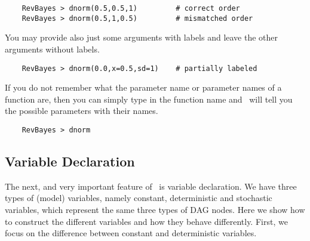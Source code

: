 {\tt \begin{snugshade*}
\begin{lstlisting}    
    RevBayes > dnorm(0.5,0.5,1)         # correct order
    RevBayes > dnorm(0.5,1,0.5)         # mismatched order
\end{lstlisting}
\end{snugshade*}}
You may provide also just some arguments with labels and leave the other arguments without labels.
{\tt \begin{snugshade*}
\begin{lstlisting}    
    RevBayes > dnorm(0.0,x=0.5,sd=1)    # partially labeled
\end{lstlisting}
\end{snugshade*}}
If you do not remember what the parameter name or parameter names of a function are, then you can simply type in the function name and \RevBayes~will tell you the possible parameters with their names.
{\tt \begin{snugshade*}
\begin{lstlisting}    
    RevBayes > dnorm
\end{lstlisting}
\end{snugshade*}}

\subsection{Variable Declaration}
The next, and very important feature of \RevBayes~is variable declaration. 
We have three types of (model) variables, namely constant, deterministic and stochastic variables, which represent the same three types of DAG nodes. 
Here we show how to construct the different variables and how they behave differently. 
First, we focus on the difference between constant and deterministic variables.

